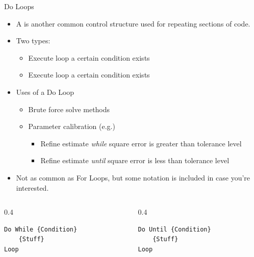 \documentclass{beamer}
\begin{document}
\begin{frame}[fragile]{Do Loops}
\begin{itemize}
  \item A  is another common control structure used for repeating sections of code.
  \item Two types:
  \begin{itemize}
    \item Execute loop  a certain condition exists
    \item Execute loop  a certain condition exists
  \end{itemize}
  \item Uses of a Do Loop
  \begin{itemize}
    \item Brute force solve methods
    \item Parameter calibration (e.g.)
    \begin{itemize}
      \item Refine estimate \emph{while} square error is greater than tolerance level
      \item Refine estimate \emph{until} square error is less than tolerance level
    \end{itemize}
  \end{itemize}
  \item Not as common as For Loops, but some notation is included in case you're interested.
\end{itemize}
\begin{columns}[T]
\begin{column}{0.4\textwidth}
\begin{lstlisting}[language=VBA]
Do While {Condition}
    {Stuff}
Loop
\end{lstlisting}
\end{column}
\begin{column}{0.4\textwidth}
\begin{lstlisting}[language=VBA]
Do Until {Condition}
    {Stuff}
Loop
\end{lstlisting}
\end{column}
\end{columns}
\end{frame}
\end{document}
